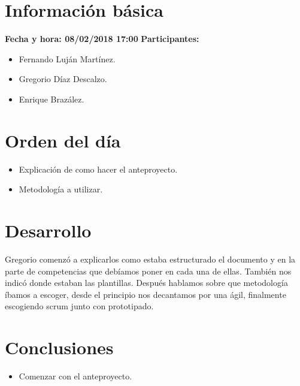 \documentclass[a4paper]{article}
\begin{document}
\section{Información básica}
\textbf{Fecha y hora: 08/02/2018 17:00}
\newline
\textbf{Participantes:}
\begin{itemize}
	\item Fernando Luján Martínez.
    \item Gregorio Díaz Descalzo.
    \item Enrique Brazález.
\end{itemize}
\section{Orden del día}
\begin{itemize}
\item Explicación de como hacer el anteproyecto.
\item Metodología a utilizar.
\end{itemize}
\section{Desarrollo}
Gregorio comenzó a explicarlos como estaba estructurado el documento y en la parte de competencias que debíamos poner en cada una de ellas. También nos indicó donde estaban las plantillas. Después hablamos sobre que metodología íbamos a escoger, desde el principio nos decantamos por una ágil, finalmente escogiendo scrum junto con prototipado.
\section{Conclusiones}
\begin{itemize}
\item Comenzar con el anteproyecto.
\end{itemize}
\end{document}
